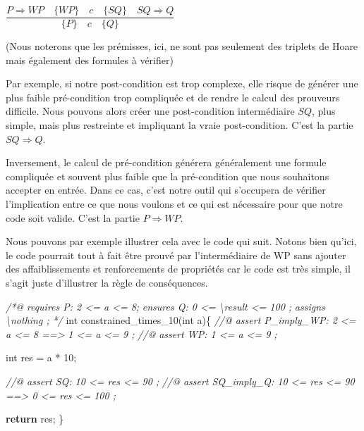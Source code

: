 \documentclass[12pt,francais,]{scrbook}
\newenvironment{Shaded}{}{}
\newcommand{\KeywordTok}[1]{\textcolor[rgb]{0.00,0.44,0.13}{\textbf{{#1}}}}
\newcommand{\DataTypeTok}[1]{\textcolor[rgb]{0.56,0.13,0.00}{{#1}}}
\newcommand{\DecValTok}[1]{\textcolor[rgb]{0.25,0.63,0.44}{{#1}}}
\newcommand{\CommentTok}[1]{\textcolor[rgb]{0.38,0.63,0.69}{\textit{{#1}}}}
\newcommand{\NormalTok}[1]{{#1}}
\begin{document}
\begin{center}\(\dfrac{P \Rightarrow WP \quad \{WP\}\quad c\quad \{SQ\} \quad SQ \Rightarrow Q}{\{P\}\quad c \quad \{Q\}}\)\end{center}

(Nous noterons que les prémisses, ici, ne sont pas seulement des
triplets de Hoare mais également des formules à vérifier)

Par exemple, si notre post-condition est trop complexe, elle risque de
générer une plus faible pré-condition trop compliquée et de rendre le
calcul des prouveurs difficile. Nous pouvons alors créer une
post-condition intermédiaire \(SQ\), plus simple, mais plus restreinte
et impliquant la vraie post-condition. C'est la partie
\(SQ \Rightarrow Q\).

Inversement, le calcul de pré-condition générera généralement une
formule compliquée et souvent plus faible que la pré-condition que nous
souhaitons accepter en entrée. Dans ce cas, c'est notre outil qui
s'occupera de vérifier l'implication entre ce que nous voulons et ce qui
est nécessaire pour que notre code soit valide. C'est la partie
\(P \Rightarrow WP\).

Nous pouvons par exemple illustrer cela avec le code qui suit. Notons
bien qu'ici, le code pourrait tout à fait être prouvé par
l'intermédiaire de WP sans ajouter des affaiblissements et renforcements
de propriétés car le code est très simple, il s'agit juste d'illustrer
la règle de conséquences.

\begin{footnotesize}\begin{Shaded}
\begin{Highlighting}[]
\CommentTok{/*@}
\CommentTok{  requires P: 2 <= a <= 8;}
\CommentTok{  ensures  Q: 0 <= \textbackslash{}result <= 100 ;}
\CommentTok{  assigns  \textbackslash{}nothing ;}
\CommentTok{*/}
\DataTypeTok{int} \NormalTok{constrained_times_10(}\DataTypeTok{int} \NormalTok{a)\{}
  \CommentTok{//@ assert P_imply_WP: 2 <= a <= 8 ==> 1 <= a <= 9 ;}
  \CommentTok{//@ assert WP:         1 <= a <= 9 ;}

  \DataTypeTok{int} \NormalTok{res = a * }\DecValTok{10}\NormalTok{;}

  \CommentTok{//@ assert SQ:         10 <= res <= 90 ;}
  \CommentTok{//@ assert SQ_imply_Q: 10 <= res <= 90 ==> 0 <= res <= 100 ;}

  \KeywordTok{return} \NormalTok{res;}
\NormalTok{\}}
\end{Highlighting}
\end{Shaded}\end{footnotesize}
\end{document}
